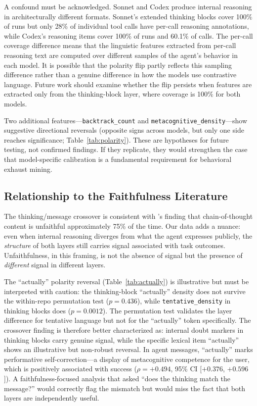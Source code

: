 \documentclass[11pt]{article}
\newcommand{\feat}[1]{\texttt{#1}}
\begin{document}
A confound must be acknowledged.
Sonnet and Codex produce internal reasoning in architecturally different formats.
Sonnet's extended thinking blocks cover 100\% of runs but only 28\% of individual tool calls have per-call reasoning annotations, while Codex's reasoning items cover 100\% of runs and 60.1\% of calls.
The per-call coverage difference means that the linguistic features extracted from per-call reasoning text are computed over different samples of the agent's behavior in each model.
It is possible that the polarity flip partly reflects this sampling difference rather than a genuine difference in how the models use contrastive language.
Future work should examine whether the flip persists when features are extracted only from the thinking-block layer, where coverage is 100\% for both models.

Two additional features---\feat{backtrack\_count} and \feat{metacognitive\_density}---show suggestive directional reversals (opposite signs across models, but only one side reaches significance; Table~\ref{tab:polarity}).
These are hypotheses for future testing, not confirmed findings.
If they replicate, they would strengthen the case that model-specific calibration is a fundamental requirement for behavioral exhaust mining.

\subsection{Relationship to the Faithfulness Literature}

The thinking/message crossover is consistent with \citet{chen2025unfaithful}'s finding that chain-of-thought content is unfaithful approximately 75\% of the time.
Our data adds a nuance: even when internal reasoning diverges from what the agent expresses publicly, the \emph{structure} of both layers still carries signal associated with task outcomes.
Unfaithfulness, in this framing, is not the absence of signal but the presence of \emph{different} signal in different layers.

The ``actually'' polarity reversal (Table~\ref{tab:actually}) is illustrative but must be interpreted with caution: the thinking-block ``actually'' density does not survive the within-repo permutation test ($p = 0.436$), while \feat{tentative\_density} in thinking blocks does ($p = 0.0012$).
The permutation test validates the layer difference for tentative language but not for the ``actually'' token specifically.
The crossover finding is therefore better characterized as: internal doubt markers in thinking blocks carry genuine signal, while the specific lexical item ``actually'' shows an illustrative but non-robust reversal.
In agent messages, ``actually'' marks performative self-correction---a display of metacognitive competence for the user, which is positively associated with success ($\rho = +0.494$, 95\% CI [$+0.376$, $+0.596$]).
A faithfulness-focused analysis that asked ``does the thinking match the message?'' would correctly flag the mismatch but would miss the fact that both layers are independently useful.
\end{document}
